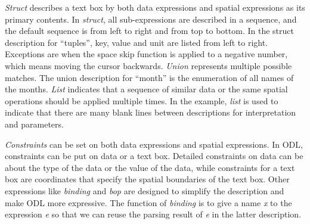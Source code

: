 {\em Struct} describes a text box by both data 
expressions and spatial expressions 
as its primary contents. 
In {\em struct}, all sub-expressions are described in a sequence, 
and the default sequence is from left to right and from top to bottom. 
In the struct description for ``tuples'', key, 
value and unit are listed from left to right. 
Exceptions are when the space skip function is applied 
to a negative number, which means moving the cursor backwards. 
{\em Union} represents multiple possible matches. 
The union description for ``month'' is the enumeration of all 
names of the months.
{\em List} indicates that a sequence of similar data or 
the same spatial operations should be applied multiple times. 
In the example, {\em list} is used to indicate that there are many 
blank lines between descriptions for interpretation and parameters.

{\em Constraints} can  
be set on both data expressions and spatial expressions. 
In ODL, constraints can be put on 
data or a text box. 
Detailed constraints on data can be about the 
type of the data or the value of the data, while constraints for a
text box are coordinates that specify the spatial boundaries of the text box. 
Other expressions like {\em binding} and {\em bop} are designed to 
simplify the description and make ODL more expressive. 
The function of {\em binding} is to give a name {\em x} to 
the expression {\em e} so that we can reuse the parsing result of {\em e} 
in the latter description. 


